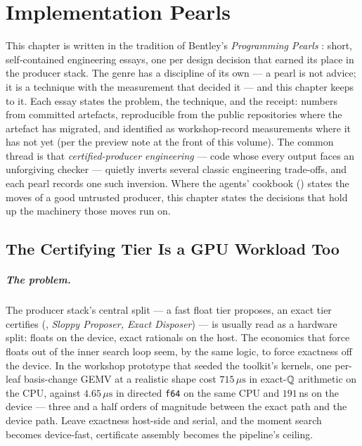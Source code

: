 \chapter{Implementation Pearls}
\label{ch:mtk-pearls}

\noindent\draftmark\medskip

This chapter is written in the tradition of Bentley's \emph{Programming
Pearls} \cite{bentley2000pearls}: short, self-contained engineering essays, one per design
decision that earned its place in the producer stack. The genre has a
discipline of its own --- a pearl is not advice; it is a technique with
the measurement that decided it --- and this chapter keeps to it. Each
essay states the problem, the technique, and the receipt: numbers from
committed artefacts, reproducible from the public repositories where
the artefact has migrated, and identified as workshop-record
measurements where it has not yet (per the preview note at the front of
this volume). The common thread is that \emph{certified-producer
engineering} --- code whose every output faces an unforgiving checker
--- quietly inverts several classic engineering trade-offs, and each
pearl records one such inversion. Where the agents' cookbook
() states the moves of a
good untrusted producer, this chapter states the decisions that hold up
the machinery those moves run on.

\section{The Certifying Tier Is a GPU Workload Too}
\label{sec:pearl-exact-gpu}

\paragraph{The problem.} The producer stack's central split ---
a fast float tier proposes, an exact tier certifies
(, \emph{Sloppy Proposer, Exact
Disposer}) --- is usually read as a hardware split: floats on the
device, exact rationals on the host. The economics that force floats
out of the inner search loop seem, by the same logic, to force
exactness off the device. In the workshop prototype that seeded the
toolkit's kernels, one per-leaf basis-change GEMV at a realistic shape
cost $715\,\mu\mathrm{s}$ in exact-$\mathbb{Q}$ arithmetic on the CPU, against
$4.65\,\mu\mathrm{s}$ in directed \texttt{f64} on the same CPU and
$191$\,ns on the device --- three and a half orders of magnitude
between the exact path and the device path. Leave exactness host-side
and serial, and the moment search becomes device-fast, certificate
assembly becomes the pipeline's ceiling.

